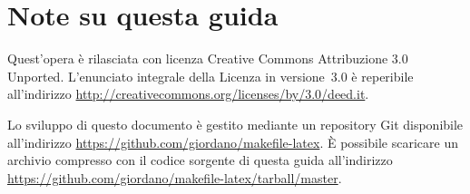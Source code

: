 \newpage{}
{}
\chapter*{Note su questa guida}
\label{cha:note-guida}

Quest'opera è rilasciata con licenza Creative Commons Attribuzione 3.0 Unported.
L'enunciato integrale della Licenza in versione~3.0 è reperibile all'indirizzo
\url{http://creativecommons.org/licenses/by/3.0/deed.it}.

Lo sviluppo di questo documento è gestito mediante un repository Git disponibile
all'indirizzo \url{https://github.com/giordano/makefile-latex}.  È possibile
scaricare un archivio compresso con il codice sorgente di questa guida
all'indirizzo \url{https://github.com/giordano/makefile-latex/tarball/master}.

